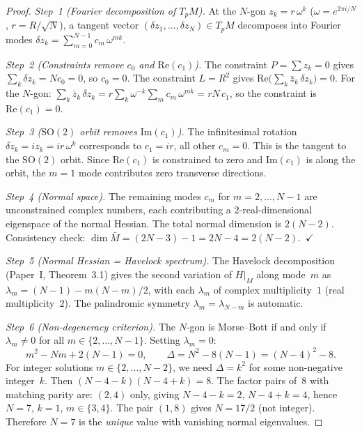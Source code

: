 \begin{proof}
\emph{Step~1 (Fourier decomposition of $T_pM$).}
At the $N$-gon $z_k = r\,\omega^k$
($\omega = e^{2\pi i/N}$, $r = R/\sqrt{N}$),
a tangent vector $(\delta z_1, \ldots, \delta z_N) \in T_pM$
decomposes into Fourier modes
$\delta z_k = \sum_{m=0}^{N-1} c_m\,\omega^{mk}$.

\emph{Step~2 (Constraints remove $c_0$ and $\mathrm{Re}(c_1)$).}
The constraint $P = \sum z_k = 0$ gives
$\sum_k \delta z_k = N c_0 = 0$, so $c_0 = 0$.
The constraint $L = R^2$ gives
$\mathrm{Re}\!\bigl(\sum_k \bar{z}_k\,\delta z_k\bigr) = 0$.
For the $N$-gon:
$\sum_k \bar{z}_k\,\delta z_k
= r\sum_k \omega^{-k}\sum_m c_m\,\omega^{mk}
= rN\,c_1$,
so the constraint is $\mathrm{Re}(c_1) = 0$.

\emph{Step~3 ($\mathrm{SO}(2)$ orbit removes $\mathrm{Im}(c_1)$).}
The infinitesimal rotation
$\delta z_k = iz_k = ir\,\omega^k$
corresponds to $c_1 = ir$, all other $c_m = 0$.
This is the tangent to the $\mathrm{SO}(2)$ orbit.
Since $\mathrm{Re}(c_1)$ is constrained to zero and
$\mathrm{Im}(c_1)$ is along the orbit,
the $m = 1$ mode contributes zero transverse directions.

\emph{Step~4 (Normal space).}
The remaining modes $c_m$ for $m = 2, \ldots, N{-}1$ are
unconstrained complex numbers, each contributing a
$2$-real-dimensional eigenspace of the normal Hessian.
The total normal dimension is $2(N{-}2)$.
Consistency check: $\dim\bar{M} = (2N{-}3) - 1 = 2N{-}4
= 2(N{-}2)$.~$\checkmark$

\emph{Step~5 (Normal Hessian = Havelock spectrum).}
The Havelock decomposition (Paper~I, Theorem~3.1) gives
the second variation of $H|_M$ along mode~$m$ as
$\lambda_m = (N{-}1) - m(N{-}m)/2$,
with each $\lambda_m$ of complex multiplicity~$1$
(real multiplicity~$2$).  The palindromic symmetry
$\lambda_m = \lambda_{N-m}$ is automatic.

\emph{Step~6 (Non-degeneracy criterion).}
The $N$-gon is Morse--Bott if and only if
$\lambda_m \ne 0$ for all $m \in \{2, \ldots, N{-}1\}$.
Setting $\lambda_m = 0$:
\[
  m^2 - Nm + 2(N{-}1) = 0,
  \qquad
  \Delta = N^2 - 8(N{-}1) = (N{-}4)^2 - 8.
\]
For integer solutions $m \in \{2, \ldots, N{-}2\}$,
we need $\Delta = k^2$ for some non-negative integer~$k$.
Then $(N{-}4{-}k)(N{-}4{+}k) = 8$.
The factor pairs of~$8$ with matching parity are:
$(2,4)$ only, giving $N{-}4{-}k = 2$, $N{-}4{+}k = 4$,
hence $N = 7$, $k = 1$, $m \in \{3, 4\}$.
The pair $(1, 8)$ gives $N = 17/2$ (not integer).
Therefore $N = 7$ is the \emph{unique} value with
vanishing normal eigenvalues.


\end{proof}
